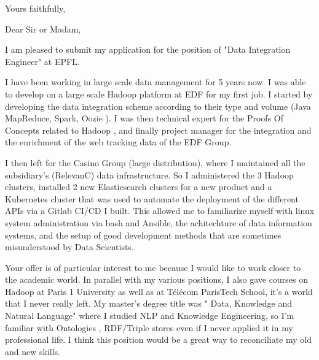 \documentclass[11pt,a4paper,sans]{moderncv}        %
\begin{document}
\date{August 28 2019}
\opening{}
\closing{Yours faithfully,}

\makelettertitle

\bigskip
\bigskip
\bigskip
\bigskip
\bigskip

Dear Sir or Madam,
\bigskip


I am pleased to submit my application for the position of "Data Integration Engineer"
at EPFL.

I have been working in large scale data management for 5 years now. I was able to develop on a large scale Hadoop
platform at EDF for my first job. I started by developing the data integration scheme according to their type and volume (Java MapReduce, Spark, Oozie
). I was then technical expert for the Proofs Of Concepts related to Hadoop
, and finally project manager for the integration and the enrichment of the web tracking data of the EDF Group.

I then left for the Casino Group (large distribution), where I maintained all the subsidiary's (RelevanC) data infrastructure. So I administered the 3 Hadoop
clusters, installed 2 new Elasticsearch
clusters for a new product and a Kubernetes
cluster that was used to automate the deployment of the different APIs
via a Gitlab CI/CD
I built. This allowed me to familiarize myself with linux system administration via bash and Ansible, the achitechture of data information systems, and the setup of good development methods that are sometimes misunderstood by Data Scientists.

Your offer is of particular interest to me because I would like to work closer to the academic world. In parallel with my various positions, I also gave courses on Hadoop
at Paris 1 University as well as at Télécom
ParisTech School, it's a world that I never really left. My master’s degree title was "
Data, Knowledge and Natural Language"
where I studied NLP
and Knowledge Engineering, so I'm familiar with Ontologies
, RDF/Triple stores even if I never applied it in my professional life. I think this position would be a great way to reconciliate
my old and new skills.
\bigskip

\makeletterclosing
\end{document}
